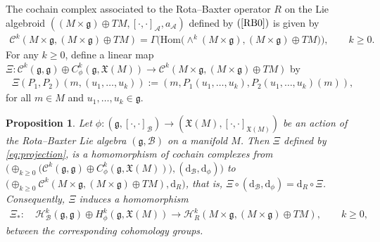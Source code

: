 \documentclass[10pt,a4paper]{amsart}
\numberwithin{equation}{section}
\newtheorem{pro}[thm]{Proposition}
\newcommand{\g}{\mathfrak g}
\newcommand{\huaA}{\mathcal{A}}
\newcommand{\huaB}{\mathcal{B}}
\newcommand{\huaC}{\mathcal{C}}
\newcommand{\huaH}{\mathcal{H}}
\newcommand{\frkX}{\mathfrak X}
\newcommand{\dM}{\mathrm{d}}
\newcommand{\Hom}{\mathrm{Hom}}
\begin{document}
The cochain complex associated to the Rota--Baxter operator $R$ on the Lie algebroid $((M \times\g)\allowbreak\oplus TM,[\cdot,\cdot]_{\huaA},a_{\huaA})$ defined by $(\ref{RB0})$ is given by
\begin{gather*}
\huaC^k(M\times \g,(M \times\g)\oplus TM)=\Gamma\big(\Hom\big({\wedge}^k(M\times \g),(M \times\g)\oplus TM\big)\big),\qquad k\geq0.
\end{gather*}
For any $k\geq 0$, define a linear map $\Xi\colon \huaC^k(\g,\g)\oplus C_\phi^k(\g,\mathfrak{X}(M))\to \huaC^k(M\times \g,(M \times\g)\oplus TM)$ by
\begin{gather}\label{eq:projection}
\Xi(P_1,P_2)(m,(u_1,\dots, u_k)):=(m,P_1(u_1,\dots, u_k),P_2(u_1,\dots, u_k)(m)),
\end{gather}
for all $m\in M$ and $u_1,\dots,u_k\in \g.$

\begin{pro}
	Let $\phi \colon (\g, [\cdot,\cdot]_\huaB)\to(\mathfrak{X}(M),[\cdot,\cdot]_{\frkX(M)})$ be an action of the Rota--Baxter Lie algebra $(\g,\huaB)$ on a manifold $M$. Then $\Xi$ defined by \eqref{eq:projection}, is a homomorphism of cochain complexes from $\big({\oplus}_{k\geq 0}\big(\huaC^k(\g,\g)\oplus C_\phi^k(\g,\mathfrak{X}(M))\big),(\dM_\huaB,\dM_\phi)\big)$ to $\big({\oplus}_{k\geq 0}\huaC^k(M\times \g,(M \times\g)\oplus TM),\dM_R\big)$, that is, $\Xi\circ(\dM_\huaB,\dM_\phi)=\dM_R\circ \Xi$. Consequently, $\Xi$ induces a homomorphism
\begin{gather*}
\Xi_\ast\colon\quad \huaH_{\huaB}^k(\g,\g)\oplus H_{\phi}^k(\g,\mathfrak{X}(M))\to \huaH_{R}^k(M\times \g,(M \times\g)\oplus TM),\qquad k\geq0,
\end{gather*}
	between the corresponding cohomology groups.
\end{pro}
\end{document}
